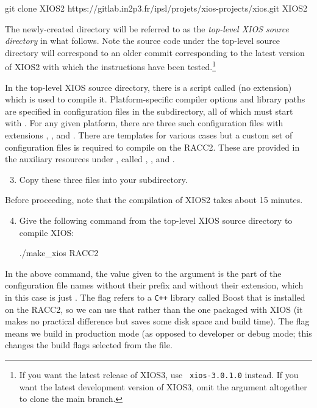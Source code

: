 \begingroup\scriptsize
\begin{VerbatimCMD}
git clone  XIOS2 https://gitlab.in2p3.fr/ipsl/projets/xios-projects/xios.git XIOS2
\end{VerbatimCMD}
\endgroup


The newly-created  directory will be referred to as the \textit{top-level XIOS source directory} in what follows.
Note the source code under the top-level source directory will correspond to an older commit corresponding to the latest version of XIOS2 with which the instructions have been tested.\footnote{
    If you want the latest release of XIOS3, use \texttt{ xios-3.0.1.0} instead.
    If you want the latest development version of XIOS3, omit the  argument altogether to clone the main branch.
}

In the top-level XIOS source directory, there is a script called  (no extension) which is used to compile it.
Platform-specific compiler options and library paths are specified in configuration files in the  subdirectory, all of which must start with .
For any given platform, there are three such configuration files with extensions , , and .
There are templates for various cases but a custom set of configuration files is required to compile on the RACC2.
These are provided in the auxiliary resources under , called , , and .

\begin{enumerate}\setcounter{enumi}{2}
    \item Copy these three files into your  subdirectory.
\end{enumerate}

Before proceeding, note that the compilation of XIOS2 takes about 15 minutes.

\begin{enumerate}\setcounter{enumi}{3}
    \item Give the following command from the top-level XIOS source directory to compile XIOS:
\begin{VerbatimCMD}
./make_xios  RACC2 
\end{VerbatimCMD}
\end{enumerate}

In the above command, the value given to the argument  is the part of the configuration file names without their prefix  and without their extension, which in this case is just .
The flag  refers to a \texttt{C++} library called Boost that is installed on the RACC2, so we can use that rather than the one packaged with XIOS (it makes no practical difference but saves some disk space and build time).
The flag  means we build in production mode (as opposed to developer or debug mode; this changes the build flags selected from the  file.
